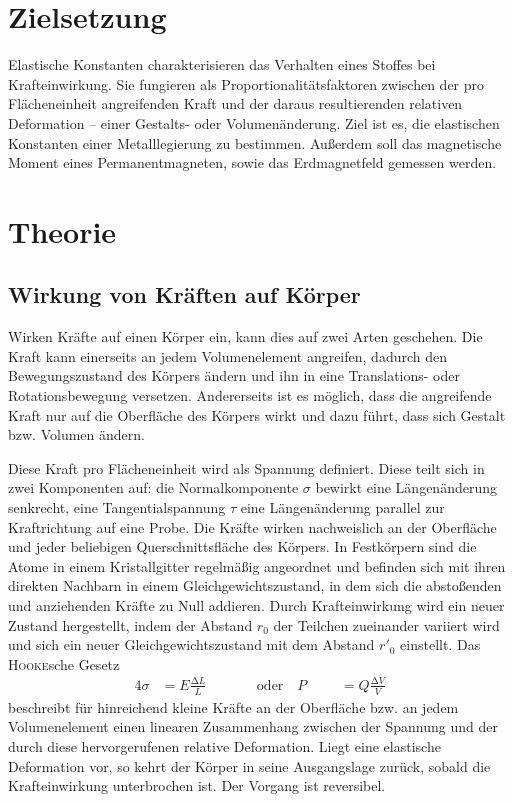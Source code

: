 \section{Zielsetzung}
Elastische Konstanten charakterisieren das Verhalten eines Stoffes bei Krafteinwirkung.
Sie fungieren als Proportionalitätsfaktoren zwischen der pro Flächeneinheit angreifenden Kraft und der daraus resultierenden relativen Deformation -- einer Gestalts- oder Volumenänderung. 
Ziel ist es, die elastischen Konstanten einer Metalllegierung zu bestimmen. Außerdem soll das magnetische Moment eines Permanentmagneten, sowie das Erdmagnetfeld gemessen werden.
\section{Theorie}
\label{sec:Theorie}
\subsection{Wirkung von Kräften auf Körper}
Wirken Kräfte auf einen Körper ein, kann dies auf zwei Arten geschehen.
Die Kraft kann einerseits an jedem Volumenelement angreifen, dadurch den Bewegungszustand des Körpers ändern und ihn in eine Translations- oder Rotationsbewegung versetzen.
Andererseits ist es möglich, dass die angreifende Kraft nur auf die Oberfläche des Körpers wirkt und dazu führt, dass sich Gestalt bzw. Volumen ändern. 

Diese Kraft pro Flächeneinheit wird als Spannung definiert. 
Diese teilt sich in zwei Komponenten auf: die Normalkomponente $\sigma$ bewirkt eine Längenänderung senkrecht, eine Tangentialspannung $\tau$ eine Längenänderung parallel zur Kraftrichtung auf eine Probe. 
Die Kräfte wirken nachweislich an der Oberfläche und jeder beliebigen Querschnittsfläche des Körpers. 
In Festkörpern sind die Atome in einem Kristallgitter regelmäßig angeordnet und befinden sich mit ihren direkten Nachbarn in einem Gleichgewichtszustand, in dem sich die abstoßenden und anziehenden Kräfte zu Null addieren. 
Durch Krafteinwirkung wird ein neuer Zustand hergestellt, indem der Abstand $r_0$ der Teilchen zueinander variiert wird und sich ein neuer Gleichgewichtszustand mit dem Abstand $r'_0$ einstellt.
Das \textsc{Hooke}sche Gesetz
\begin{alignat}{4}
\sigma&=E\frac{\mathup{\Delta}{L}}{L}\qquad &&\text{oder} \quad P&&&=Q\frac{\mathup{\Delta}{V}}{V}
\label{eq:hooke}
\end{alignat}
beschreibt für hinreichend kleine Kräfte an der Oberfläche bzw. an jedem Volumenelement einen linearen Zusammenhang zwischen der Spannung und der durch diese hervorgerufenen relative Deformation.
Liegt eine elastische Deformation vor, so kehrt der Körper in seine Ausgangslage zurück, sobald die Krafteinwirkung unterbrochen ist.
Der Vorgang ist reversibel. 
